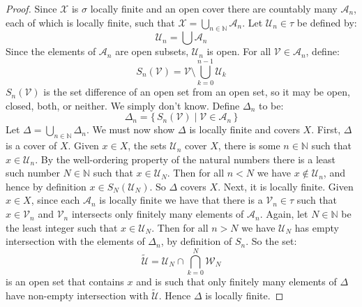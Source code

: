 \documentclass{article}
\theoremstyle{plain}
\theoremstyle{normal}
\begin{document}
        \begin{proof}
            Since $\mathcal{X}$ is $\sigma$ locally finite and an open cover
            there are countably many $\mathcal{A}_{n}$, each of which is
            locally finite, such that
            $\mathcal{X}=\bigcup_{n\in\mathbb{N}}\mathcal{A}_{n}$. Let
            $\mathcal{U}_{n}\in\tau$ be defined by:
            \begin{equation}
                \mathcal{U}_{n}=\bigcup\mathcal{A}_{n}
            \end{equation}
            Since the elements of $\mathcal{A}_{n}$ are open subsets,
            $\mathcal{U}_{n}$ is open. For all
            $\mathcal{V}\in\mathcal{A}_{n}$, define:
            \begin{equation}
                S_{n}(\mathcal{V})=
                \mathcal{V}\setminus\bigcup_{k=0}^{n-1}\mathcal{U}_{k}
            \end{equation}
            $S_{n}(\mathcal{V})$ is the set difference of an open set from
            an open set, so it may be open, closed, both, or neither. We simply
            don't know. Define $\Delta_{n}$ to be:
            \begin{equation}
                \Delta_{n}
                =\{\,S_{n}(\mathcal{V})\;|\;\mathcal{V}\in\mathcal{A}_{n}\,\}
            \end{equation}
            Let $\Delta=\bigcup_{n\in\mathbb{N}}\Delta_{n}$. We must now show
            $\Delta$ is locally finite and covers $X$. First, $\Delta$ is a
            cover of $X$. Given $x\in{X}$, the sets $\mathcal{U}_{n}$ cover
            $X$, there is some $n\in\mathbb{N}$ such that $x\in\mathcal{U}_{n}$.
            By the well-ordering property of the natural numbers there is a
            least such number $N\in\mathbb{N}$ such that $x\in\mathcal{U}_{N}$.
            Then for all $n<N$ we have $x\notin\mathcal{U}_{n}$, and hence
            by definition $x\in{S}_{N}(\mathcal{U}_{N})$. So
            $\Delta$ covers $X$. Next, it is locally finite. Given
            $x\in{X}$, since each $\mathcal{A}_{n}$ is locally finite we have
            that there is a $\mathcal{V}_{n}\in\tau$ such that
            $x\in\mathcal{V}_{n}$ and $\mathcal{V}_{n}$ intersects only
            finitely many elements of $\mathcal{A}_{n}$. Again, let
            $N\in\mathbb{N}$ be the least integer such that
            $x\in\mathcal{U}_{N}$. Then for all $n>N$ we have
            $\mathcal{U}_{N}$ has empty intersection with the elements of
            $\Delta_{n}$, by definition of $S_{n}$. So the set:
            \begin{equation}
                \tilde{\mathcal{U}}
                =\mathcal{U}_{N}\cap\bigcap_{k=0}^{N}\mathcal{W}_{N}
            \end{equation}
            is an open set that contains $x$ and is such that only finitely
            many elements of $\Delta$ have non-empty intersection with
            $\tilde{\mathcal{U}}$. Hence $\Delta$ is locally finite.
        \end{proof}
\end{document}

